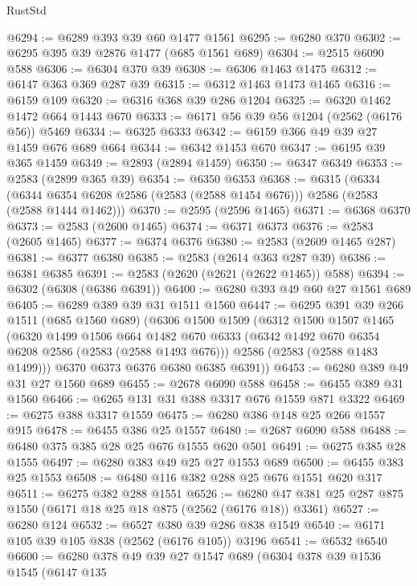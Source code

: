 \begin{lexlean}{RustStd}
\begin{coremodule}
{\begin{coremodule}
{{{{{{{{{{{{{{{@6294 := @6289 @393 @39 @60 @1477 @1561
@6295 := @6280 @370
@6302 := @6295 @395 @39 @2876 @1477 (@685 @1561 @689)
@6304 := @2515 @6090 @588
@6306 := @6304 @370 @39
@6308 := @6306 @1463 @1475
@6312 := @6147 @363 @369 @287 @39
@6315 := @6312 @1463 @1473 @1465
@6316 := @6159 @109
@6320 := @6316 @368 @39 @286 @1204
@6325 := @6320 @1462 @1472 @664 @1443 @670
@6333 := @6171 @56 @39 @56 @1204 (@2562 (@6176 @56)) @5469
@6334 := @6325 @6333
@6342 := @6159 @366 @49 @39 @27 @1459 @676 @689 @664
@6344 := @6342 @1453 @670
@6347 := @6195 @39 @365 @1459
@6349 := @2893 (@2894 @1459)
@6350 := @6347 @6349
@6353 := @2583 (@2899 @365 @39)
@6354 := @6350 @6353
@6368 := @6315
    (@6334 (@6344 @6354 @6208 @2586 (@2583 (@2588 @1454 @676))) @2586 (@2583 (@2588 @1444 @1462)))
@6370 := @2595 (@2596 @1465)
@6371 := @6368 @6370
@6373 := @2583 (@2600 @1465)
@6374 := @6371 @6373
@6376 := @2583 (@2605 @1465)
@6377 := @6374 @6376
@6380 := @2583 (@2609 @1465 @287)
@6381 := @6377 @6380
@6385 := @2583 (@2614 @363 @287 @39)
@6386 := @6381 @6385
@6391 := @2583 (@2620 (@2621 (@2622 @1465)) @588)
@6394 := @6302 (@6308 (@6386 @6391))
@6400 := @6280 @393 @49 @60 @27 @1561 @689
@6405 := @6289 @389 @39 @31 @1511 @1560
@6447 := @6295
    @391
    @39
    @266
    @1511
    (@685 @1560 @689)
    (@6306
      @1500
      @1509
      (@6312
        @1500
        @1507
        @1465
        (@6320
          @1499
          @1506
          @664
          @1482
          @670
          @6333
          (@6342 @1492 @670 @6354 @6208 @2586 (@2583 (@2588 @1493 @676)))
          @2586
          (@2583 (@2588 @1483 @1499)))
        @6370
        @6373
        @6376
        @6380
        @6385
        @6391))
@6453 := @6280 @389 @49 @31 @27 @1560 @689
@6455 := @2678 @6090 @588
@6458 := @6455 @389 @31 @1560
@6466 := @6265 @131 @31 @388 @3317 @676 @1559 @871 @3322
@6469 := @6275 @388 @3317 @1559
@6475 := @6280 @386 @148 @25 @266 @1557 @915
@6478 := @6455 @386 @25 @1557
@6480 := @2687 @6090 @588
@6488 := @6480 @375 @385 @28 @25 @676 @1555 @620 @501
@6491 := @6275 @385 @28 @1555
@6497 := @6280 @383 @49 @25 @27 @1553 @689
@6500 := @6455 @383 @25 @1553
@6508 := @6480 @116 @382 @288 @25 @676 @1551 @620 @317
@6511 := @6275 @382 @288 @1551
@6526 := @6280 @47 @381 @25 @287 @875 @1550 (@6171 @18 @25 @18 @875 (@2562 (@6176 @18)) @3361)
@6527 := @6280 @124
@6532 := @6527 @380 @39 @286 @838 @1549
@6540 := @6171 @105 @39 @105 @838 (@2562 (@6176 @105)) @3196
@6541 := @6532 @6540
@6600 := @6280
    @378
    @49
    @39
    @27
    @1547
    @689
    (@6304
      @378
      @39
      @1536
      @1545
      (@6147
        @135
}}}}}}}}}}}}}}}
\end{coremodule}}
\end{coremodule}
\end{lexlean}
